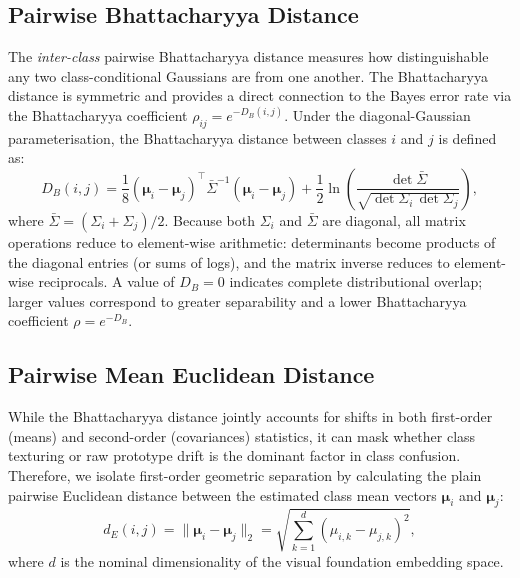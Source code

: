 \subsection{Pairwise Bhattacharyya Distance}
\label{sec:method:separability:bhattacharyya}

The \emph{inter-class} pairwise Bhattacharyya distance measures how distinguishable any two class-conditional Gaussians are from one another.
The Bhattacharyya distance is symmetric and provides a direct connection to the Bayes error rate via the Bhattacharyya coefficient $\rho_{ij} = e^{-D_B(i,j)}$.
Under the diagonal-Gaussian parameterisation, the Bhattacharyya distance between classes $i$ and $j$ is defined as:
\begin{equation}
	D_B(i,j)
	= \frac{1}{8}(\boldsymbol{\mu}_i - \boldsymbol{\mu}_j)^{\top}
	\bar{\Sigma}^{-1}
	(\boldsymbol{\mu}_i - \boldsymbol{\mu}_j)
	+ \frac{1}{2}\ln\!\left(
	\frac{\det\bar{\Sigma}}{\sqrt{\det\Sigma_i\,\det\Sigma_j}}
	\right),
	\label{eq:interclass_bhattacharyya}
\end{equation}
where $\bar{\Sigma} = (\Sigma_i + \Sigma_j)/2$.
Because both $\Sigma_i$ and $\bar{\Sigma}$ are diagonal, all matrix operations reduce to element-wise arithmetic: determinants become products of the diagonal entries (or sums of logs), and the matrix inverse reduces to element-wise reciprocals.
A value of $D_B=0$ indicates complete distributional overlap; larger values correspond to greater separability and a lower Bhattacharyya coefficient $\rho = e^{-D_B}$.

\subsection{Pairwise Mean Euclidean Distance}
\label{sec:method:separability:euclidean}

While the Bhattacharyya distance jointly accounts for shifts in both first-order (means) and second-order (covariances) statistics, it can mask whether class texturing or raw prototype drift is the dominant factor in class confusion. Therefore, we isolate first-order geometric separation by calculating the plain pairwise Euclidean distance between the estimated class mean vectors $\boldsymbol{\mu}_i$ and $\boldsymbol{\mu}_j$:
\begin{equation}
	d_E(i,j) = \|\boldsymbol{\mu}_i - \boldsymbol{\mu}_j\|_2 = \sqrt{\sum_{k=1}^{d} (\mu_{i,k} - \mu_{j,k})^2},
	\label{eq:interclass_euclidean}
\end{equation}
where $d$ is the nominal dimensionality of the visual foundation embedding space.

